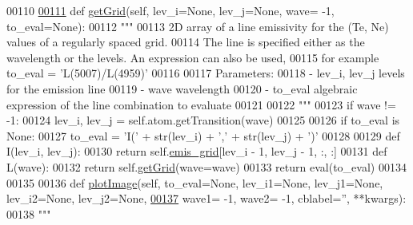 \begin{DoxyCode}
00110 
\hypertarget{emis_grid_8py_source_l00111}{}\hyperlink{classpyneb_1_1core_1_1emis_grid_1_1_emis_grid_af9a9219e5ddfcfd53c52466e2c2deb44}{00111}     \textcolor{keyword}{def }\hyperlink{classpyneb_1_1core_1_1emis_grid_1_1_emis_grid_af9a9219e5ddfcfd53c52466e2c2deb44}{getGrid}(self, lev\_i=None, lev\_j=None, wave= -1, to\_eval=None):
00112         \textcolor{stringliteral}{"""}
00113 \textcolor{stringliteral}{        2D array of a line emissivity for the (Te, Ne) values of a regularly spaced grid.}
00114 \textcolor{stringliteral}{        The line is specified either as the wavelength or the levels. An expression can also be used, }
00115 \textcolor{stringliteral}{        for example to\_eval = 'L(5007)/L(4959)'}
00116 \textcolor{stringliteral}{        }
00117 \textcolor{stringliteral}{        Parameters:}
00118 \textcolor{stringliteral}{            - lev\_i, lev\_j   levels for the emission line}
00119 \textcolor{stringliteral}{            - wave           wavelength}
00120 \textcolor{stringliteral}{            - to\_eval        algebraic expression of the line combination to evaluate}
00121 \textcolor{stringliteral}{        }
00122 \textcolor{stringliteral}{        """}
00123         \textcolor{keywordflow}{if} wave != -1:
00124             lev\_i, lev\_j = self.atom.getTransition(wave)
00125 
00126         \textcolor{keywordflow}{if} to\_eval \textcolor{keywordflow}{is} \textcolor{keywordtype}{None}:
00127             to\_eval = \textcolor{stringliteral}{'I('} + str(lev\_i) + \textcolor{stringliteral}{','} + str(lev\_j) + \textcolor{stringliteral}{')'}
00128             
00129         \textcolor{keyword}{def }I(lev\_i, lev\_j):
00130             \textcolor{keywordflow}{return} self.\hyperlink{classpyneb_1_1core_1_1emis_grid_1_1_emis_grid_a6fd6b209384aaa2cd4ba5051477e4ecb}{emis\_grid}[lev\_i - 1, lev\_j - 1, :, :]
00131         \textcolor{keyword}{def }L(wave):
00132             \textcolor{keywordflow}{return} self.\hyperlink{classpyneb_1_1core_1_1emis_grid_1_1_emis_grid_af9a9219e5ddfcfd53c52466e2c2deb44}{getGrid}(wave=wave)
00133         \textcolor{keywordflow}{return} eval(to\_eval)
00134     
00135     
00136     \textcolor{keyword}{def }\hyperlink{classpyneb_1_1core_1_1emis_grid_1_1_emis_grid_acc7005176ce79eb13fdca3ff1607d6e8}{plotImage}(self, to\_eval=None, lev\_i1=None, lev\_j1=None, lev\_i2=None, lev\_j2=None,
\hypertarget{emis_grid_8py_source_l00137}{}\hyperlink{classpyneb_1_1core_1_1emis_grid_1_1_emis_grid_acc7005176ce79eb13fdca3ff1607d6e8}{00137}                   wave1= -1, wave2= -1, cblabel=\textcolor{stringliteral}{''}, **kwargs):
00138         \textcolor{stringliteral}{"""}

\end{DoxyCode}
